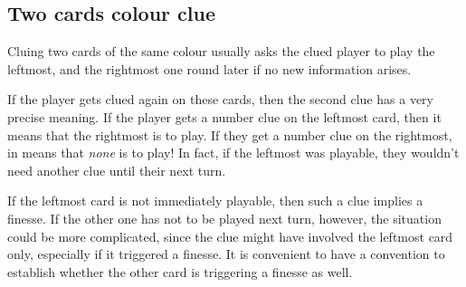 \documentclass[a4paper]{article}
\theoremstyle{plain}
\theoremstyle{definition}
\newtheorem{convention}[theorem]{Convention}
\begin{document}
\subsection{Two cards colour clue}

Cluing two cards of the same colour usually asks the clued player to play the leftmost, and the rightmost one round later if no new information arises.

If the player gets clued again on these cards, then the second clue has a very precise meaning. If the player gets a number clue on the leftmost card, then it means that the rightmost is to play. If they get a number clue on the rightmost, in means that \textit{none} is to play! In fact, if the leftmost was playable, they wouldn't need another clue until their next turn.

If the leftmost card is not immediately playable, then such a clue implies a finesse. If the other one has not to be played next turn, however, the situation could be more complicated, since the clue might have involved the leftmost card only, especially if it triggered a finesse. It is convenient to have a convention to establish whether the other card is triggering a finesse as well.

\end{document}
